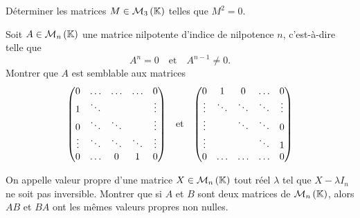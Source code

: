 \documentclass{magnolia}
\begin{document}
Déterminer les matrices $M\in\mathcal{M}_{3}\left(\mathbb{K}\right)$ telles que $M^2=0$.

Soit $A\in\mathcal{M}_{n}\left(\mathbb{K}\right)$ une matrice nilpotente d'indice de nilpotence $n$,
c'est-à-dire telle que
\[A^n=0 \quad \text{et} \quad A^{n-1}\not=0.\]
Montrer que $A$ est semblable aux matrices
\[\begin{pmatrix}
  0       & \dots  & \dots  & \dots  & 0\\
  1       & \ddots &        &        & \vdots\\
  0       & \ddots & \ddots &        & \vdots\\
  \vdots  & \ddots & \ddots & \ddots & \vdots\\
  0       & \dots  & 0      & 1      & 0
  \end{pmatrix}\quad\!\text{et}\quad\!
  \begin{pmatrix}
  0       & 1      & 0      & \dots  & 0\\
  \vdots  & \ddots & \ddots & \ddots & \vdots\\
  \vdots  &        & \ddots & \ddots & 0\\
  \vdots  &        &        & \ddots & 1\\
  0       & \dots  & \dots  & \dots  & 0
  \end{pmatrix}\]

On appelle valeur propre d'une matrice $X\in\mathcal{M}_{n}\left(\mathbb{K}\right)$ tout réel
$\lambda$ tel que $X-\lambda I_n$ ne soit pas inversible. Montrer que si $A$
et $B$ sont deux matrices de $\mathcal{M}_{n}\left(\mathbb{K}\right)$, alors $AB$ et $BA$ ont les
mêmes valeurs propres non nulles.

\end{document}

